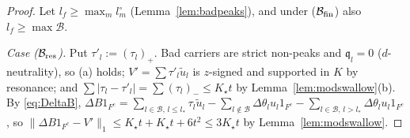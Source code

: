 \documentclass[10pt]{amsart}
\theoremstyle{definition}
\theoremstyle{remark}
\begin{document}
\begin{proof}
Let $l_f\ge\max_ml^\circ_m$ (Lemma~\ref{lem:badpeaks}), and under
($\mathcal B_{\rm fin}$) also $l_f\ge\max\mathcal B$.

\emph{Case ($\mathcal B_{\rm res}$).}  Put $\tau'_l:=(\tau_l)_+$.  Bad
carriers are strict non-peaks and $\mathfrak q_l=0$ ($d$-neutrality), so
(a) holds; $V'=\sum\tau'_l\tilde u_l$ is $z$-signed and supported in $K$
by resonance; and $\sum|\tau_l-\tau'_l|=\sum(\tau_l)_-\le K_\star t$ by
Lemma~\ref{lem:modswallow}(b).  By \eqref{eq:DeltaB}, $\Delta B1_{F^c}=
\sum_{l\in\mathcal B,\,l\le l_*}\tau_l\tilde u_l-\sum_{l\notin\mathcal B}
\Delta\theta_lu_l1_{F^c}-\sum_{l\in\mathcal B,\,l>l_*}\Delta\theta_lu_l
1_{F^c}$, so $\|\Delta B1_{F^c}-V'\|_1\le K_\star t+K_\star t+6t^2\le3K_\star t$
by Lemma~\ref{lem:modswallow}.


\end{proof}
\end{document}
